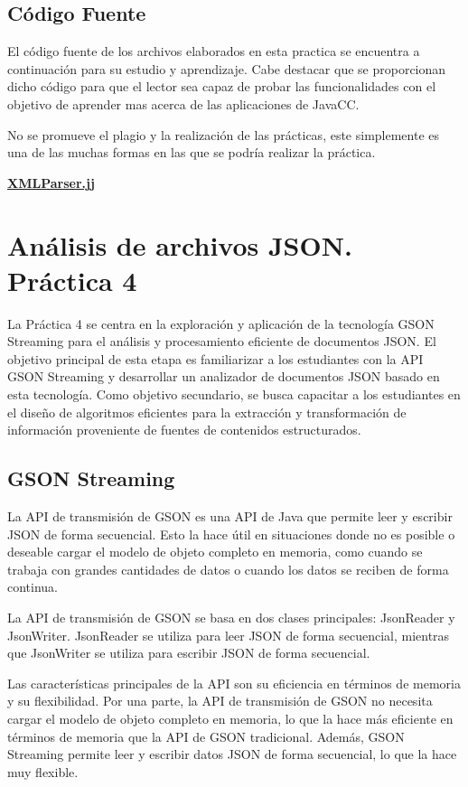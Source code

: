 \subsection{Código Fuente}

\noindent El código fuente de los archivos elaborados en esta practica se encuentra a continuación para su estudio y aprendizaje. Cabe destacar que se proporcionan dicho código para que el lector sea capaz de probar las funcionalidades con el objetivo de aprender mas acerca de las aplicaciones de JavaCC.

No se promueve el plagio y la realización de las prácticas, este simplemente es una de las muchas formas en las que se podría realizar la práctica.

\hyperref[sec:XMLParser]{\textbf{XMLParser.jj}}

\section{Análisis de archivos JSON. Práctica 4}

\noindent La Práctica 4 se centra en la exploración y aplicación de la tecnología GSON Streaming para el análisis y procesamiento eficiente de documentos JSON. El objetivo principal de esta etapa es familiarizar a los estudiantes con la API GSON Streaming y desarrollar un analizador de documentos JSON basado en esta tecnología. Como objetivo secundario, se busca capacitar a los estudiantes en el diseño de algoritmos eficientes para la extracción y transformación de información proveniente de fuentes de contenidos estructurados.

\subsection{GSON Streaming}

\noindent La API de transmisión de GSON es una API de Java que permite leer y escribir JSON de forma secuencial. Esto la hace útil en situaciones donde no es posible o deseable cargar el modelo de objeto completo en memoria, como cuando se trabaja con grandes cantidades de datos o cuando los datos se reciben de forma continua.

La API de transmisión de GSON se basa en dos clases principales: JsonReader y JsonWriter. JsonReader se utiliza para leer JSON de forma secuencial, mientras que JsonWriter se utiliza para escribir JSON de forma secuencial.

Las características principales de la API son su eficiencia en términos de memoria y  su flexibilidad. Por una parte, la API de transmisión de GSON no necesita cargar el modelo de objeto completo en memoria, lo que la hace más eficiente en términos de memoria que la API de GSON tradicional. Además, GSON Streaming permite leer y escribir datos JSON de forma secuencial, lo que la hace muy flexible.

